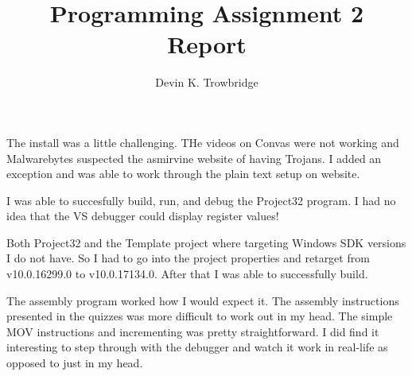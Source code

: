 \documentclass[a4paper,10pt]{article}
\title{Programming Assignment 2 Report}
\author{Devin K. Trowbridge}
\begin{document}
\maketitle

The install was a little challenging. THe videos on Convas were not working and Malwarebytes suspected the asmirvine website of having Trojans. I added an exception and was able to work through the plain text setup on website.

I was able to succesfully build, run, and debug the Project32 program. I had no idea that the VS debugger could display register values!

Both Project32 and the Template project where targeting Windows SDK versions I do not have. So I had to go into the project properties and retarget from v10.0.16299.0 to v10.0.17134.0. After that I was able to successfully build.

The assembly program worked how I would expect it. The assembly instructions presented in the quizzes was more difficult to work out in my head. The simple MOV instructions and incrementing was pretty straightforward. I did find it interesting to step through with the debugger and watch it work in real-life as opposed to just in my head.
\end{document}
